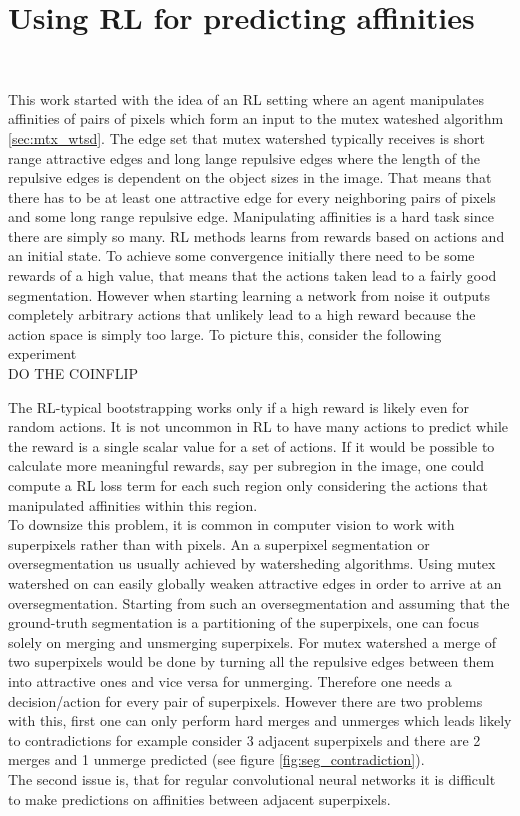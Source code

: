 \section{Using RL for predicting affinities}~\label{sec:rl_for_seg}

This work started with the idea of an RL setting where an agent manipulates affinities of pairs of pixels which form an input to the mutex wateshed algorithm \ref{sec:mtx_wtsd}. The edge set that mutex watershed typically receives is short range attractive edges and long lange repulsive edges where the length of the repulsive edges is dependent on the object sizes in the image. That means that there has to be at least one attractive edge for every neighboring pairs of pixels and some long range repulsive edge. Manipulating affinities is a hard task since there are simply so many. RL methods learns from rewards based on actions and an initial state. To achieve some convergence initially there need to be some rewards of a high value, that means that the actions taken lead to a fairly good segmentation. However when starting learning a network from noise it outputs completely arbitrary actions that unlikely lead to a high reward because the action space is simply too large. To picture this, consider the following experiment \\
 DO THE COINFLIP


 The RL-typical bootstrapping works only if a high reward is likely even for random actions. It is not uncommon in RL to have many actions to predict while the reward is a single scalar value for a set of actions. If it would be possible to calculate more meaningful rewards, say per subregion in the image, one could compute a RL loss term for each such region only considering the actions that manipulated affinities within this region.\\

To downsize this problem, it is common in computer vision to work with superpixels \cite{10.1007/978-3-642-23094-3_3} rather than  with pixels. An a superpixel segmentation or oversegmentation us usually achieved by watersheding algorithms.
Using mutex watershed on can easily globally weaken attractive edges in order to arrive at an oversegmentation.
 Starting from such an oversegmentation and assuming that the ground-truth segmentation is a partitioning of the superpixels, one can focus solely on merging and unsmerging superpixels. For mutex watershed a merge of two superpixels would be done by turning all the repulsive edges between them into attractive ones and vice versa for unmerging. Therefore one needs a decision/action for every pair of superpixels. However there are two problems with this, first one can only perform hard merges and unmerges which leads likely to contradictions for example consider 3 adjacent superpixels and there are 2 merges and 1 unmerge predicted (see figure \ref{fig:seg_contradiction}).\\
 The second issue is, that for regular convolutional neural networks it is difficult to make predictions on affinities between adjacent superpixels.